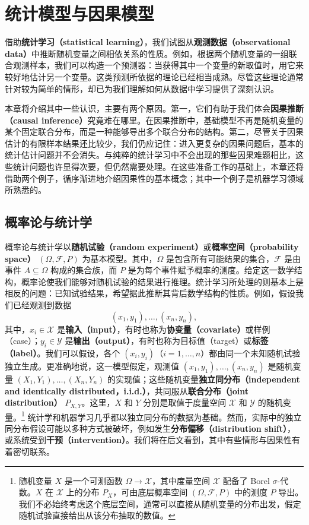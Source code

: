 \chapter{统计模型与因果模型}
\label{ch:statistical-causal-models}

借助\textbf{统计学习（statistical learning）}，我们试图从\textbf{观测数据（observational data）}中推断随机变量之间相依关系的性质。例如，根据两个随机变量的一组联合观测样本，我们可以构造一个预测器：当获得其中一个变量的新取值时，用它来较好地估计另一个变量。这类预测所依据的理论已经相当成熟。尽管这些理论通常针对较为简单的情形，却已为我们理解如何从数据中学习提供了深刻认识。

本章将介绍其中一些认识，主要有两个原因。第一，它们有助于我们体会\textbf{因果推断（causal inference）}究竟难在哪里。在因果推断中，基础模型不再是随机变量的某个固定联合分布，而是一种能够导出多个联合分布的结构。第二，尽管关于因果估计的有限样本结果还比较少，我们仍应记住：进入更复杂的因果问题后，基本的统计估计问题并不会消失。与纯粹的统计学习中不会出现的那些因果难题相比，这些统计问题也许显得次要，但仍然需要处理。在这些准备工作的基础上，本章还将借助两个例子，循序渐进地介绍因果性的基本概念；其中一个例子是机器学习领域所熟悉的。

\section{概率论与统计学}
\label{sec:probability-statistics}

概率论与统计学以\textbf{随机试验（random experiment）}或\textbf{概率空间（probability space）} $(\Omega,\mathcal{F},P)$ 为基本模型。其中，$\Omega$ 是包含所有可能结果的集合，$\mathcal{F}$ 是由事件 $A\subseteq\Omega$ 构成的集合族，而 $P$ 是为每个事件赋予概率的测度。给定这一数学结构，概率论使我们能够对随机试验的结果进行推理。统计学习所处理的则基本上是相反的问题：已知试验结果，希望据此推断其背后数学结构的性质。例如，假设我们已经观测到数据
\begin{equation}
 (x_1,y_1),\ldots,(x_n,y_n),
 \tag{1.1}
\end{equation}
其中，$x_i\in\mathcal{X}$ 是\textbf{输入（input）}，有时也称为\textbf{协变量（covariate）}或样例（case）；$y_i\in\mathcal{Y}$ 是\textbf{输出（output）}，有时也称为目标值（target）或\textbf{标签（label）}。我们可以假设，各个 $(x_i,y_i)$（$i=1,\ldots,n$）都由同一个未知随机试验独立生成。更准确地说，这一模型假定，观测值 $(x_1,y_1),\ldots,(x_n,y_n)$ 是随机变量 $(X_1,Y_1),\ldots,(X_n,Y_n)$ 的实现值；这些随机变量\textbf{独立同分布（independent and identically distributed，i.i.d.）}，共同服从\textbf{联合分布（joint distribution）} $P_{X,Y}$。这里，$X$ 和 $Y$ 分别是取值于度量空间 $\mathcal{X}$ 和 $\mathcal{Y}$ 的随机变量。\footnote{随机变量 $X$ 是一个可测函数 $\Omega\to\mathcal{X}$，其中度量空间 $\mathcal{X}$ 配备了 Borel $\sigma$-代数。$X$ 在 $\mathcal{X}$ 上的分布 $P_X$，可由底层概率空间 $(\Omega,\mathcal{F},P)$ 中的测度 $P$ 导出。我们不必始终考虑这个底层空间，通常可以直接从随机变量的分布出发，假定随机试验直接给出从该分布抽取的数值。}
统计学和机器学习几乎都以独立同分布的数据为基础。然而，实际中的独立同分布假设可能以多种方式被破坏，例如发生\textbf{分布偏移（distribution shift）}，或系统受到\textbf{干预（intervention）}。我们将在后文看到，其中有些情形与因果性有着密切联系。

